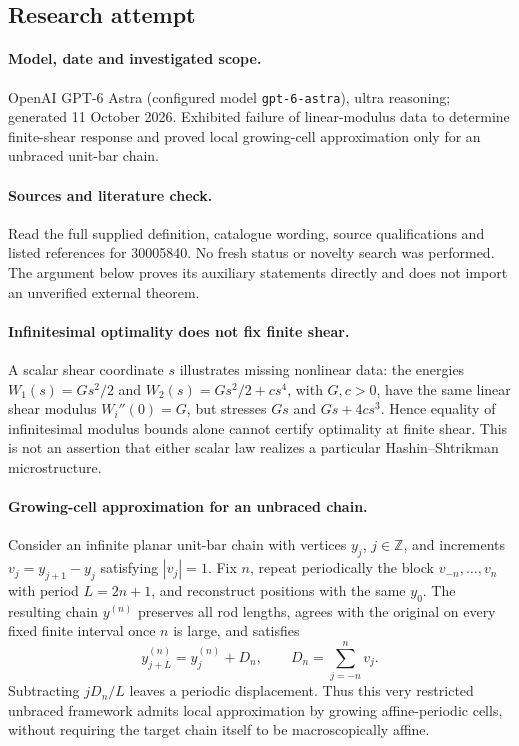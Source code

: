 \documentclass[11pt]{article}
\begin{document}
\subsection{Research attempt}
\paragraph{Model, date and investigated scope.}
OpenAI GPT-6 Astra (configured model \texttt{gpt-6-astra}), ultra reasoning; generated 11 October 2026. Exhibited failure of linear-modulus data to determine finite-shear response and proved local growing-cell approximation only for an unbraced unit-bar chain.

\paragraph{Sources and literature check.}
Read the full supplied definition, catalogue wording, source qualifications and listed references for 30005840. No fresh status or novelty search was performed. The argument below proves its auxiliary statements directly and does not import an unverified external theorem.

\paragraph{Infinitesimal optimality does not fix finite shear.} A scalar shear coordinate \(s\) illustrates missing nonlinear data: the energies \(W_1(s)=Gs^2/2\) and \(W_2(s)=Gs^2/2+cs^4\), with \(G,c>0\), have the same linear shear modulus \(W_i''(0)=G\), but stresses \(Gs\) and \(Gs+4cs^3\). Hence equality of infinitesimal modulus bounds alone cannot certify optimality at finite shear. This is not an assertion that either scalar law realizes a particular Hashin--Shtrikman microstructure.
\paragraph{Growing-cell approximation for an unbraced chain.} Consider an infinite planar unit-bar chain with vertices \(y_j\), \(j\in\mathbb Z\), and increments \(v_j=y_{j+1}-y_j\) satisfying \(|v_j|=1\). Fix \(n\), repeat periodically the block \(v_{-n},\ldots,v_n\) with period \(L=2n+1\), and reconstruct positions with the same \(y_0\). The resulting chain \(y^{(n)}\) preserves all rod lengths, agrees with the original on every fixed finite interval once \(n\) is large, and satisfies
\[
 y^{(n)}_{j+L}=y^{(n)}_j+D_n,\qquad
 D_n=\sum_{j=-n}^n v_j.
\]
Subtracting \(jD_n/L\) leaves a periodic displacement. Thus this very restricted unbraced framework admits local approximation by growing affine-periodic cells, without requiring the target chain itself to be macroscopically affine.
\end{document}
